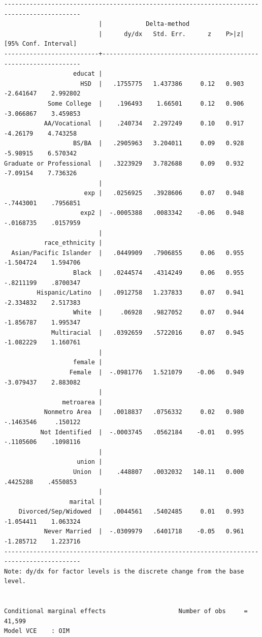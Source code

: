 \documentclass[
]{book}
\begin{document}
\begin{verbatim}
-------------------------------------------------------------------------------------------
                          |            Delta-method
                          |      dy/dx   Std. Err.      z    P>|z|     [95% Conf. Interval]
--------------------------+----------------------------------------------------------------
                   educat |
                     HSD  |   .1755775   1.437386     0.12   0.903    -2.641647    2.992802
            Some College  |    .196493    1.66501     0.12   0.906    -3.066867    3.459853
           AA/Vocational  |    .240734   2.297249     0.10   0.917     -4.26179    4.743258
                   BS/BA  |   .2905963   3.204011     0.09   0.928     -5.98915    6.570342
Graduate or Professional  |   .3223929   3.782688     0.09   0.932     -7.09154    7.736326
                          |
                      exp |   .0256925   .3928606     0.07   0.948    -.7443001    .7956851
                     exp2 |  -.0005388   .0083342    -0.06   0.948    -.0168735    .0157959
                          |
           race_ethnicity |
  Asian/Pacific Islander  |   .0449909   .7906855     0.06   0.955    -1.504724    1.594706
                   Black  |   .0244574   .4314249     0.06   0.955    -.8211199    .8700347
         Hispanic/Latino  |   .0912758   1.237833     0.07   0.941    -2.334832    2.517383
                   White  |     .06928   .9827052     0.07   0.944    -1.856787    1.995347
             Multiracial  |   .0392659   .5722016     0.07   0.945    -1.082229    1.160761
                          |
                   female |
                  Female  |  -.0981776   1.521079    -0.06   0.949    -3.079437    2.883082
                          |
                metroarea |
           Nonmetro Area  |   .0018837   .0756332     0.02   0.980    -.1463546     .150122
          Not Identified  |  -.0003745   .0562184    -0.01   0.995    -.1105606    .1098116
                          |
                    union |
                   Union  |    .448807   .0032032   140.11   0.000     .4425288    .4550853
                          |
                  marital |
    Divorced/Sep/Widowed  |   .0044561   .5402485     0.01   0.993    -1.054411    1.063324
           Never Married  |  -.0309979   .6401718    -0.05   0.961    -1.285712    1.223716
-------------------------------------------------------------------------------------------
Note: dy/dx for factor levels is the discrete change from the base level.


Conditional marginal effects                    Number of obs     =     41,599
Model VCE    : OIM


\end{verbatim}
\end{document}
